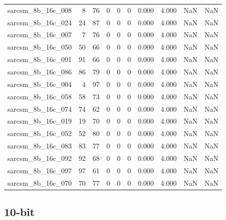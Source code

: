 \documentclass{article}
\begin{document}
\begin{longtable}{lrrrrrrrrr}
sarcsm\_8b\_16c\_008 & 8 & 76 & 0 & 0 & 0 & 0.000 & 4.000 & NaN & NaN \\
sarcsm\_8b\_16c\_024 & 24 & 87 & 0 & 0 & 0 & 0.000 & 4.000 & NaN & NaN \\
sarcsm\_8b\_16c\_007 & 7 & 76 & 0 & 0 & 0 & 0.000 & 4.000 & NaN & NaN \\
sarcsm\_8b\_16c\_050 & 50 & 66 & 0 & 0 & 0 & 0.000 & 4.000 & NaN & NaN \\
sarcsm\_8b\_16c\_091 & 91 & 66 & 0 & 0 & 0 & 0.000 & 4.000 & NaN & NaN \\
sarcsm\_8b\_16c\_086 & 86 & 79 & 0 & 0 & 0 & 0.000 & 4.000 & NaN & NaN \\
sarcsm\_8b\_16c\_004 & 4 & 97 & 0 & 0 & 0 & 0.000 & 4.000 & NaN & NaN \\
sarcsm\_8b\_16c\_058 & 58 & 73 & 0 & 0 & 0 & 0.000 & 4.000 & NaN & NaN \\
sarcsm\_8b\_16c\_074 & 74 & 62 & 0 & 0 & 0 & 0.000 & 4.000 & NaN & NaN \\
sarcsm\_8b\_16c\_019 & 19 & 70 & 0 & 0 & 0 & 0.000 & 4.000 & NaN & NaN \\
sarcsm\_8b\_16c\_052 & 52 & 80 & 0 & 0 & 0 & 0.000 & 4.000 & NaN & NaN \\
sarcsm\_8b\_16c\_083 & 83 & 77 & 0 & 0 & 0 & 0.000 & 4.000 & NaN & NaN \\
sarcsm\_8b\_16c\_092 & 92 & 68 & 0 & 0 & 0 & 0.000 & 4.000 & NaN & NaN \\
sarcsm\_8b\_16c\_097 & 97 & 61 & 0 & 0 & 0 & 0.000 & 4.000 & NaN & NaN \\
sarcsm\_8b\_16c\_070 & 70 & 77 & 0 & 0 & 0 & 0.000 & 4.000 & NaN & NaN \\
\end{longtable}

\subsection*{10-bit}
\end{document}
